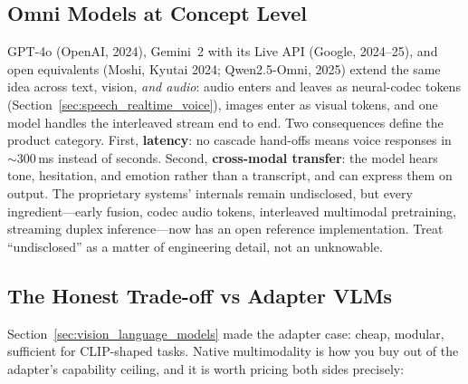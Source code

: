 \subsection{Omni Models at Concept Level}

GPT-4o (OpenAI, 2024), Gemini~2 with its Live API (Google, 2024--25), and open equivalents (Moshi, Kyutai 2024; Qwen2.5-Omni, 2025) extend the same idea across text, vision, \textit{and audio}: audio enters and leaves as neural-codec tokens (Section~\ref{sec:speech_realtime_voice}), images enter as visual tokens, and one model handles the interleaved stream end to end. Two consequences define the product category. First, \textbf{latency}: no cascade hand-offs means voice responses in $\sim$300\,ms instead of seconds. Second, \textbf{cross-modal transfer}: the model hears tone, hesitation, and emotion rather than a transcript, and can express them on output. The proprietary systems' internals remain undisclosed, but every ingredient---early fusion, codec audio tokens, interleaved multimodal pretraining, streaming duplex inference---now has an open reference implementation. Treat ``undisclosed'' as a matter of engineering detail, not an unknowable.

\subsection{The Honest Trade-off vs Adapter VLMs}

Section~\ref{sec:vision_language_models} made the adapter case: cheap, modular, sufficient for CLIP-shaped tasks. Native multimodality is how you buy out of the adapter's capability ceiling, and it is worth pricing both sides precisely:

